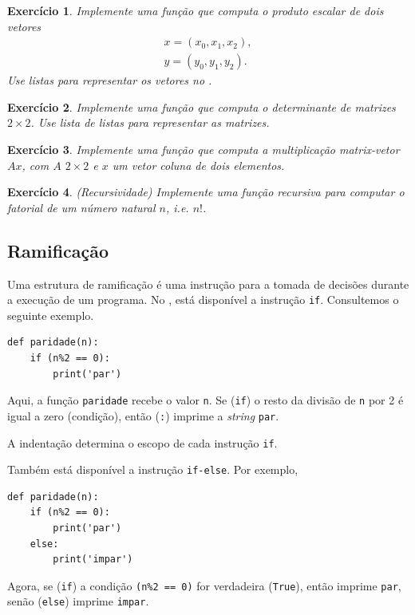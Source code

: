 \documentclass[12pt]{article}
\newtheorem{exr}{Exercício}[section]
\begin{document}
\begin{exr}
  Implemente uma função que computa o produto escalar de dois vetores
  \begin{gather}
    x = (x_0, x_1, x_2),\\
    y = (y_0, y_1, y_2).
  \end{gather}
  Use listas para representar os vetores no {\python}.
\end{exr}

\begin{exr}
  Implemente uma função que computa o determinante de matrizes $2\times 2$. Use lista de listas para representar as matrizes.
\end{exr}

\begin{exr}
  Implemente uma função que computa a multiplicação matrix-vetor $Ax$, com $A$ $2\times 2$ e $x$ um vetor coluna de dois elementos.
\end{exr}

\begin{exr}(Recursividade) Implemente uma função recursiva para computar o fatorial de um número natural $n$, i.e. $n!$.  
\end{exr}

\subsection{Ramificação}

Uma estrutura de ramificação é uma instrução para a tomada de decisões durante a execução de um programa. No {\python}, está disponível a instrução \lstinline+if+. Consultemos o seguinte exemplo.
\begin{lstlisting}
def paridade(n):
    if (n%2 == 0):
        print('par')
\end{lstlisting}
Aqui, a função \lstinline+paridade+ recebe o valor \lstinline+n+. Se (\lstinline+if+) o resto da divisão de \lstinline+n+ por 2 é igual a zero (condição), então (\lstinline+:+) imprime a {\it string} \lstinline+par+.

\begin{obs}
  A indentação determina o escopo de cada instrução \lstinline+if+.
\end{obs}

Também está disponível a instrução \lstinline+if-else+. Por exemplo,
\begin{lstlisting}
def paridade(n):
    if (n%2 == 0):
        print('par')
    else:
        print('impar')    
\end{lstlisting}
Agora, se (\lstinline+if+) a condição \lstinline!(n%2 == 0)! for verdadeira (\lstinline+True+), então imprime \lstinline+par+, senão (\lstinline+else+) imprime \lstinline+impar+.
\end{document}

